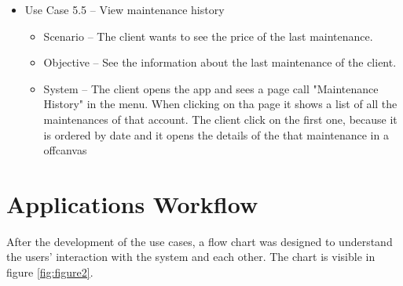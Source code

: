 \begin{itemize}
\begin{itemize}
  \end{itemize}
      \item Use Case 5.5 – View maintenance history
  \begin{itemize}
    \item Scenario – The client wants to see the price of the last maintenance.
    \item Objective – See the information about the last maintenance of the client.
    \item System – The client opens the app and sees a page call "Maintenance History" in the menu. When clicking on tha page it shows a list of all the maintenances of that account. The client click on the first one, because it is ordered by date and it opens the details of the that maintenance in a offcanvas 
  \end{itemize}
\end{itemize}
\hfill \break



\section{Applications Workflow}

After the development of the use cases, a flow chart was designed to understand the users' interaction with the system and each other. The chart is visible in figure \ref{fig:figure2}.


